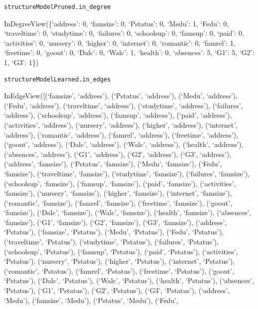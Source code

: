 \documentclass[
]{article}
\begin{document}
\begin{verbatim}
structureModelPruned.in_degree
\end{verbatim}

InDegreeView(\{`address': 0, `famsize': 0, `Pstatus': 0, `Medu': 1,
`Fedu': 0, `traveltime': 0, `studytime': 0, `failures': 0, `schoolsup':
0, `famsup': 0, `paid': 0, `activities': 0, `nursery': 0, `higher': 0,
`internet': 0, `romantic': 0, `famrel': 1, `freetime': 0, `goout': 0,
`Dalc': 0, `Walc': 1, `health': 0, `absences': 5, `G1': 5, `G2': 1,
`G3': 1\})

\begin{verbatim}
structureModelLearned.in_edges
\end{verbatim}

InEdgeView({[}(`famsize', `address'), (`Pstatus', `address'), (`Medu',
`address'), (`Fedu', `address'), (`traveltime', `address'),
(`studytime', `address'), (`failures', `address'), (`schoolsup',
`address'), (`famsup', `address'), (`paid', `address'), (`activities',
`address'), (`nursery', `address'), (`higher', `address'), (`internet',
`address'), (`romantic', `address'), (`famrel', `address'), (`freetime',
`address'), (`goout', `address'), (`Dalc', `address'), (`Walc',
`address'), (`health', `address'), (`absences', `address'), (`G1',
`address'), (`G2', `address'), (`G3', `address'), (`address',
`famsize'), (`Pstatus', `famsize'), (`Medu', `famsize'), (`Fedu',
`famsize'), (`traveltime', `famsize'), (`studytime', `famsize'),
(`failures', `famsize'), (`schoolsup', `famsize'), (`famsup',
`famsize'), (`paid', `famsize'), (`activities', `famsize'), (`nursery',
`famsize'), (`higher', `famsize'), (`internet', `famsize'), (`romantic',
`famsize'), (`famrel', `famsize'), (`freetime', `famsize'), (`goout',
`famsize'), (`Dalc', `famsize'), (`Walc', `famsize'), (`health',
`famsize'), (`absences', `famsize'), (`G1', `famsize'), (`G2',
`famsize'), (`G3', `famsize'), (`address', `Pstatus'), (`famsize',
`Pstatus'), (`Medu', `Pstatus'), (`Fedu', `Pstatus'), (`traveltime',
`Pstatus'), (`studytime', `Pstatus'), (`failures', `Pstatus'),
(`schoolsup', `Pstatus'), (`famsup', `Pstatus'), (`paid', `Pstatus'),
(`activities', `Pstatus'), (`nursery', `Pstatus'), (`higher',
`Pstatus'), (`internet', `Pstatus'), (`romantic', `Pstatus'), (`famrel',
`Pstatus'), (`freetime', `Pstatus'), (`goout', `Pstatus'), (`Dalc',
`Pstatus'), (`Walc', `Pstatus'), (`health', `Pstatus'), (`absences',
`Pstatus'), (`G1', `Pstatus'), (`G2', `Pstatus'), (`G3', `Pstatus'),
(`address', `Medu'), (`famsize', `Medu'), (`Pstatus', `Medu'), (`Fedu',
\end{document}
